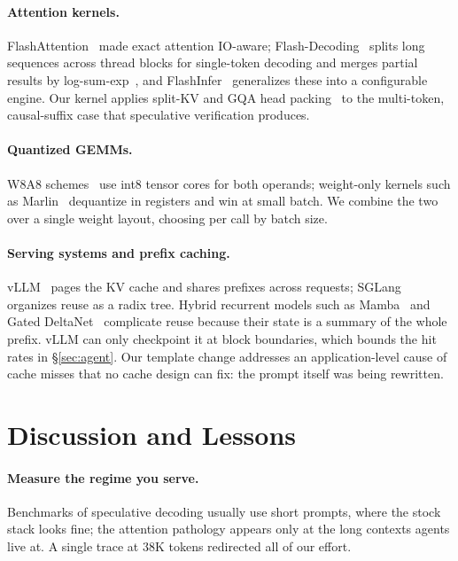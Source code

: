 \documentclass[acmtog,nonacm,screen]{acmart}
\begin{document}
\paragraph{Attention kernels.} FlashAttention~\cite{dao2022flashattention,dao2024flashattention2} made exact attention
IO-aware; Flash-Decoding~\cite{dao2023flashdecoding} splits long sequences across thread blocks for single-token
decoding and merges partial results by log-sum-exp~\cite{milakov2018online}, and FlashInfer~\cite{ye2025flashinfer}
generalizes these into a configurable engine. Our kernel applies split-KV and GQA head packing~\cite{ainslie2023gqa}
to the multi-token, causal-suffix case that speculative verification produces.

\paragraph{Quantized GEMMs.} W8A8 schemes~\cite{dettmers2022llmint8,xiao2023smoothquant} use int8 tensor cores for both
operands; weight-only kernels such as Marlin~\cite{frantar2025marlin} dequantize in registers and win at small batch.
We combine the two over a single weight layout, choosing per call by batch size.

\paragraph{Serving systems and prefix caching.} vLLM~\cite{kwon2023vllm} pages the KV cache and shares prefixes across
requests; SGLang~\cite{zheng2024sglang} organizes reuse as a radix tree. Hybrid recurrent models such as
Mamba~\cite{gu2023mamba} and Gated DeltaNet~\cite{yang2025gateddeltanet} complicate reuse because their state is a summary
of the whole prefix. vLLM can only checkpoint it at block boundaries, which bounds the hit rates in \S\ref{sec:agent}.
Our template change addresses an application-level cause of cache misses that no cache design can fix: the prompt
itself was being rewritten.

\section{Discussion and Lessons}

\paragraph{Measure the regime you serve.} Benchmarks of speculative decoding usually use short prompts, where the
stock stack looks fine; the attention pathology appears only at the long contexts agents live at. A single trace
at 38K tokens redirected all of our effort.
\end{document}

